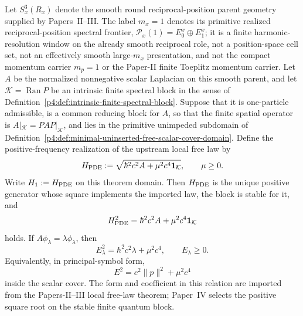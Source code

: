 \documentclass[12pt,a4paper]{article}
\begin{document}
\begin{theorem}
\label{p4:thm:finite-one-particle-dispersion}
Let \(S^3_x(R_x)\) denote the smooth round reciprocal-position parent
geometry supplied by Papers~II--III.  The label \(m_x=1\) denotes its
primitive realized reciprocal-position spectral frontier,
\(\mathcal P_x(1)=E_0^x\oplus E_1^x\); it is a finite harmonic-resolution
window on the already smooth reciprocal role, not a position-space cell set,
not an effectively smooth large-\(m_x\) presentation, and not the compact
momentum carrier \(m_p=1\) or the Paper-II finite Toeplitz momentum carrier.
Let \(A\) be the normalized nonnegative scalar Laplacian on this
smooth parent, and let
\(\mathcal K=\operatorname{Ran}P\) be an intrinsic finite spectral block in
the sense of
Definition~\ref{p4:def:intrinsic-finite-spectral-block}.  Suppose that it is
one-particle admissible, is a common reducing block for \(A\), so that the
finite spatial operator is \(A|_{\mathcal K}=PAP|_{\mathcal K}\), and lies in the
primitive unimpeded subdomain of
Definition~\ref{p4:def:minimal-uninserted-free-scalar-cover-domain}.  Define
the positive-frequency realization of the upstream local free law by
\begin{equation}
\label{p4:eq:upstream-positive-frequency-definition}
H_{\rm PDE}
:=
\sqrt{\hbar^2c^2A+\mu^2c^4\mathbf1_{\mathcal K}},
\qquad \mu\ge0.
\end{equation}
Write \(H_1:=H_{\rm PDE}\) on this theorem domain.
Then \(H_{\rm PDE}\) is the unique positive generator whose square implements
the imported law, the block is stable for it, and
\begin{equation}
\label{p4:eq:one-particle-hamiltonian-square}
  H_{\rm PDE}^2
  =
  \hbar^2c^2 A+\mu^2c^4\mathbf 1_{\mathcal K}
\end{equation}
holds.  If \(A\phi_\lambda=\lambda\phi_\lambda\), then
\begin{equation}
\label{p4:eq:finite-one-particle-dispersion}
  E_\lambda^2
  =
  \hbar^2c^2\lambda+\mu^2c^4,
  \qquad
  E_\lambda\ge0.
\end{equation}
Equivalently, in principal-symbol form,
\begin{equation}
\label{p4:eq:finite-one-particle-mass-shell}
  E^2
  =
  c^2\|p\|^2+\mu^2c^4
\end{equation}
inside the scalar cover.  The form and coefficient in this relation are
imported from the Papers-II--III local free-law theorem; Paper~IV selects the
positive square root on the stable finite quantum block.


\end{theorem}
\end{document}
